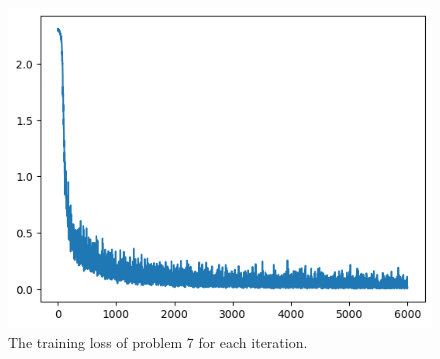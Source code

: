 \documentclass[10pt]{article}
\begin{document}
\begin{figure}[!h]
    \begin{center}
        \includegraphics[scale = 0.5]{figure/fig1.png}
    \end{center}
    \caption{The training loss of problem 7 for each iteration.}
\end{figure}
\end{document}
